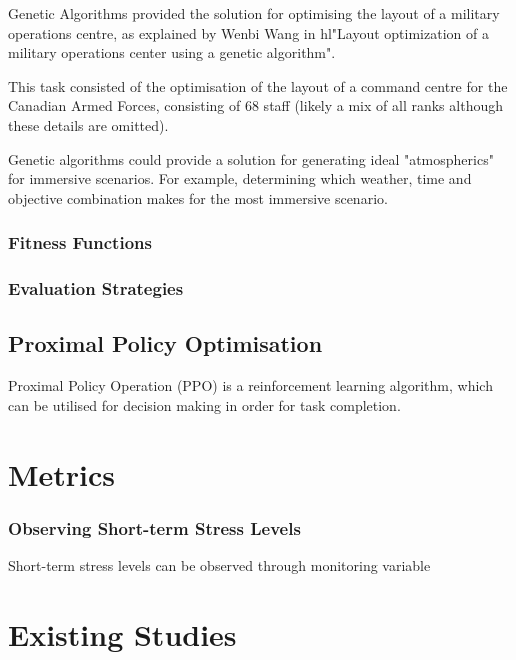 \documentclass{article}
\begin{document}
Genetic Algorithms provided the solution for optimising the layout of a military operations centre, as explained by Wenbi Wang in hl{"Layout optimization of a military operations center using a genetic algorithm".}

This task consisted of the optimisation of the layout of a command centre for the Canadian Armed Forces, consisting of 68 staff (likely a mix of all ranks although these details are omitted).

Genetic algorithms could provide a solution for generating ideal "atmospherics" for immersive scenarios. For example, determining which weather, time and objective combination makes for the most immersive scenario.  

\subsubsection{Fitness Functions}



\subsubsection{Evaluation Strategies}

\subsection{Proximal Policy Optimisation}

Proximal Policy Operation (PPO) is a reinforcement learning algorithm, which can be utilised for decision making in order for task completion. \cite{schulman2017proximal}

\section{Metrics}

\subsubsection{Observing Short-term Stress Levels}

Short-term stress levels can be observed through monitoring variable 

\section{Existing Studies}

\end{document}
